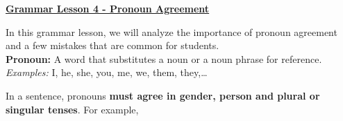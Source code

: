 \documentclass[12pt]{article} %
\begin{document}
	\renewcommand*{\coursecode}{MATH 235} %
	\renewcommand*{\assgnnumber}{Assignment 1} %
	\renewcommand*{\submdate}{September 14, 2021} %
	\renewcommand*{\studentfname}{Abdullah} %
	\renewcommand*{\studentlname}{Zubair} %
    \renewcommand*{\proofname}{Proof:}

	\renewcommand\qedsymbol{$\blacksquare$}
	\setfigpath
	\fancyhfoffset[L,O]{0pt} %




\begin{center}
  \textbf{\underline{\Huge{Grammar Lesson 4 - Pronoun Agreement}}}
\end{center}

In this grammar lesson, we will analyze the importance of pronoun agreement and a few mistakes that are common for students.\\

\textbf{Pronoun:} A word that substitutes a noun or a noun phrase for reference.\\
\textit{Examples:} I, he, she, you, me, we, them, they,\ldots

In a sentence, pronouns \textbf{must agree in gender, person and plural or singular tenses}. For example,
\end{document}
